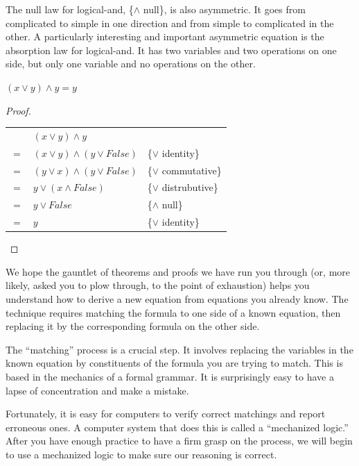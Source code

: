 The null law for logical-and, \{$\wedge$ null\}, is also asymmetric. It goes from complicated to simple in one direction and from simple to complicated in the other. A particularly interesting and important asymmetric equation is the absorption law for logical-and. It has two variables and two operations on one side, but only one variable and no operations on the other.

\begin{theorem}
$(x \vee y) \wedge y = y$
\label{and-absorption-thm}
\end{theorem}

\begin{proof}
\mbox{} \\
\begin{tabular}{llp{3.15in}}
    &$(x \vee y) \wedge y$                 & \\
$=$ & $(x \vee y) \wedge (y \vee False)$   & \{$\vee$ identity\} \\
$=$ & $(y \vee x) \wedge (y \vee False)$   & \{$\vee$ commutative\} \\
$=$ & $y \vee (x \wedge False)$            & \{$\vee$ distrubutive\} \\
$=$ & $y \vee False$                       & \{$\wedge$ null\} \\
$=$ & $y$                                  & \{$\vee$ identity\} \\
\end{tabular}

\end{proof}

We hope the gauntlet of theorems and proofs we have run you through (or, more likely, asked you to plow through, to the point of exhaustion) helps you understand how to derive a new equation from equations you already know. The technique requires matching the formula to one side of a known equation, then replacing it by the corresponding formula on the other side.

The ``matching'' process is a crucial step. It involves replacing the variables in the known equation by constituents of the formula you are trying to match. This is based in the mechanics of a formal grammar. It is surprisingly easy to have a lapse of concentration and make a mistake.

Fortunately, it is easy for computers to verify correct matchings and report erroneous ones. A computer system that does this is called a ``mechanized logic.'' After you have enough practice to have a firm grasp on the process, we will begin to use a mechanized logic to make sure our reasoning is correct.

